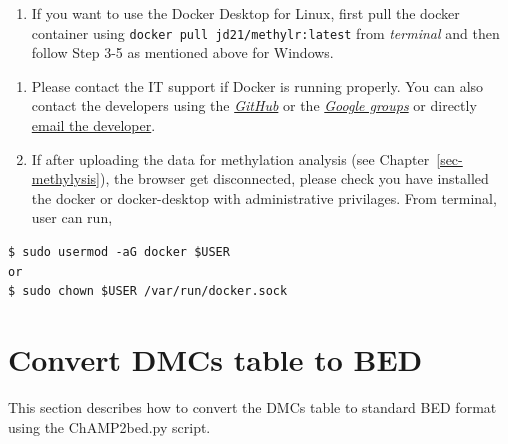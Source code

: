 \documentclass[
  a4paper,
  oneside,
  open=any]{scrreport}
\providecommand{\tightlist}{%
  \setlength{\itemsep}{0pt}\setlength{\parskip}{0pt}}\usepackage{longtable,booktabs,array}
\begin{document}
\begin{enumerate}
\def\labelenumi{\arabic{enumi}.}
\setcounter{enumi}{1}
\tightlist
\item
  If you want to use the Docker Desktop for Linux, first pull the docker
  container using \texttt{docker\ pull\ jd21/methylr:latest} from
  \emph{terminal} and then follow Step 3-5 as mentioned above for
  Windows.
\end{enumerate}

\begin{tcolorbox}[enhanced jigsaw, bottomrule=.15mm, left=2mm, coltitle=black, breakable, colback=white, arc=.35mm, rightrule=.15mm, opacitybacktitle=0.6, toptitle=1mm, leftrule=.75mm, toprule=.15mm, bottomtitle=1mm, opacityback=0, colbacktitle=quarto-callout-note-color!10!white, titlerule=0mm, colframe=quarto-callout-note-color-frame, title=\textcolor{quarto-callout-note-color}{\faInfo}\hspace{0.5em}{Note}]

\begin{enumerate}
\def\labelenumi{\arabic{enumi}.}
\tightlist
\item
  Please contact the IT support if Docker is running properly. You can
  also contact the developers using the
  \href{https://github.com/JD2112/methylr/issues}{\emph{GitHub}} or the
  \href{https://groups.google.com/g/methylr}{\emph{Google groups}} or
  directly \href{mailto:methylr@googlegroups.com}{email the developer}.
\item
  If after uploading the data for methylation analysis (see
  Chapter~\ref{sec-methylysis}), the browser get disconnected, please
  check you have installed the docker or docker-desktop with
  administrative privilages. From terminal, user can run,
\end{enumerate}

\begin{verbatim}
$ sudo usermod -aG docker $USER
or
$ sudo chown $USER /var/run/docker.sock
\end{verbatim}

\end{tcolorbox}

\hypertarget{sec-bed}{%
\chapter{Convert DMCs table to BED}\label{sec-bed}}

This section describes how to convert the DMCs table to standard BED
format using the ChAMP2bed.py script.
\end{document}
